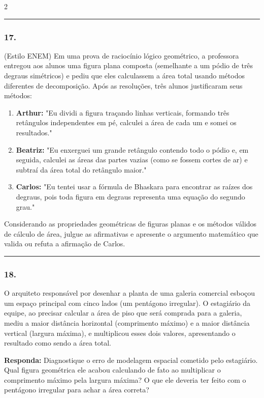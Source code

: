 \documentclass[twoside, 10pt, a4paper]{article}
\newlength{\espacoPreQuestao}\setlength{\espacoPreQuestao}{0.1cm}
\newlength{\espacoQuestao}\setlength{\espacoQuestao}{0.2cm}
\newlength{\espacoAlt}\setlength{\espacoAlt}{0.2cm}
\begin{document}
\begin{multicols*}{2}
\noindent\textcolor{CorLinha}{\rule{\linewidth}{0.5pt}} 
\par\vspace{\espacoPreQuestao}
\subsubsection*{17.} (Estilo ENEM) Em uma prova de raciocínio lógico geométrico, a professora entregou aos alunos uma figura plana composta (semelhante a um pódio de três degraus simétricos) e pediu que eles calculassem a área total usando métodos diferentes de decomposição. Após as resoluções, três alunos justificaram seus métodos:

\begin{enumerate}[label=\Roman*., itemsep=\espacoAlt]
\item \textbf{Arthur:} "Eu dividi a figura traçando linhas verticais, formando três retângulos independentes em pé, calculei a área de cada um e somei os resultados."
\item \textbf{Beatriz:} "Eu enxerguei um grande retângulo contendo todo o pódio e, em seguida, calculei as áreas das partes vazias (como se fossem cortes de ar) e subtraí da área total do retângulo maior."
\item \textbf{Carlos:} "Eu tentei usar a fórmula de Bhaskara para encontrar as raízes dos degraus, pois toda figura em degraus representa uma equação do segundo grau."
\end{enumerate}

Considerando as propriedades geométricas de figuras planas e os métodos válidos de cálculo de área, julgue as afirmativas e apresente o argumento matemático que valida ou refuta a afirmação de Carlos.
\par\vspace{\espacoQuestao}

\noindent\textcolor{CorLinha}{\rule{\linewidth}{0.5pt}} 
\par\vspace{\espacoPreQuestao}
\subsubsection*{18.} O arquiteto responsável por desenhar a planta de uma galeria comercial esboçou um espaço principal com cinco lados (um pentágono irregular). O estagiário da equipe, ao precisar calcular a área de piso que será comprada para a galeria, mediu a maior distância horizontal (comprimento máximo) e a maior distância vertical (largura máxima), e multiplicou esses dois valores, apresentando o resultado como sendo a área total.
\begin{boxresponda}
\textbf{Responda:} Diagnostique o erro de modelagem espacial cometido pelo estagiário. Qual figura geométrica ele acabou calculando de fato ao multiplicar o comprimento máximo pela largura máxima? O que ele deveria ter feito com o pentágono irregular para achar a área correta?
\end{boxresponda}
\par\vspace{\espacoQuestao}


\end{multicols*}
\end{document}
